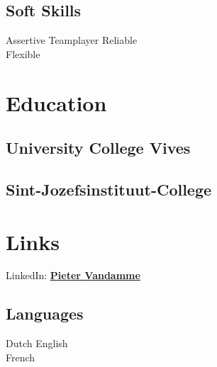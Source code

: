 \documentclass[a4paper]{deedy-resume} %
\begin{document}
\begin{minipage}[t]{0.33\textwidth}
\sectionspace %

\subsection{Soft Skills}
Assertive \textbullet{} Teamplayer \textbullet{} Reliable \\ Flexible
\sectionspace %


\section{Education} 

\subsection{University College Vives}


\sectionspace %

\subsection{Sint-Jozefsinstituut-College}


\sectionspace %


\section{Links} 

LinkedIn: \href{https://be.linkedin.com/in/pieter-vandamme-700b03a0}{\bf Pieter Vandamme} 

\sectionspace %

\subsection{Languages}

Dutch \textbullet{} English  \\

\vspace{\topsep} %
French

\sectionspace %


\end{minipage} %
\end{document}
